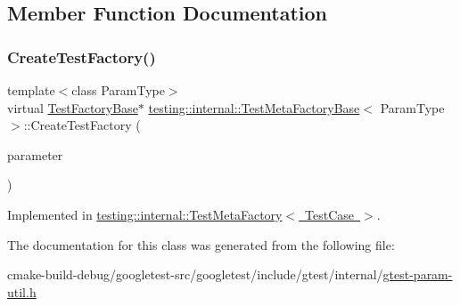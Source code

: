 \subsection{Member Function Documentation}
\mbox{\label{classtesting_1_1internal_1_1TestMetaFactoryBase_a853daab362740bcac55e180128d564ef}} 
\subsubsection{\texorpdfstring{CreateTestFactory()}{CreateTestFactory()}}
{\footnotesize\ttfamily template$<$class Param\+Type$>$ \\
virtual \mbox{\hyperlink{classtesting_1_1internal_1_1TestFactoryBase}{Test\+Factory\+Base}}$\ast$ \mbox{\hyperlink{classtesting_1_1internal_1_1TestMetaFactoryBase}{testing\+::internal\+::\+Test\+Meta\+Factory\+Base}}$<$ Param\+Type $>$\+::Create\+Test\+Factory (\begin{DoxyParamCaption}\item[{Param\+Type}]{parameter }\end{DoxyParamCaption})\hspace{0.3cm}{\ttfamily [pure virtual]}}



Implemented in \mbox{\hyperlink{classtesting_1_1internal_1_1TestMetaFactory_ae9f5334c68af309bca8f7ec29d837e38}{testing\+::internal\+::\+Test\+Meta\+Factory$<$ Test\+Case $>$}}.



The documentation for this class was generated from the following file\+:\begin{DoxyCompactItemize}
\item 
cmake-\/build-\/debug/googletest-\/src/googletest/include/gtest/internal/\mbox{\hyperlink{gtest-param-util_8h}{gtest-\/param-\/util.\+h}}\end{DoxyCompactItemize}
